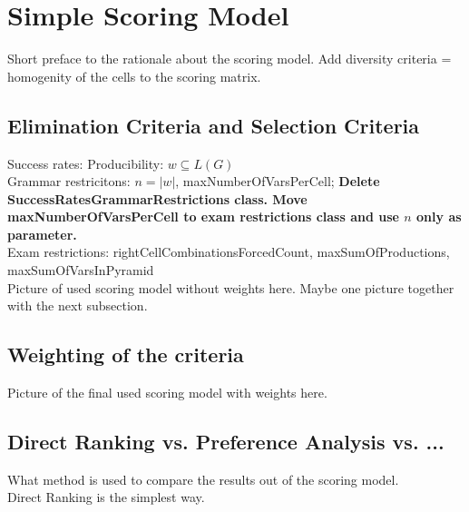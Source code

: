 
\section{Simple Scoring Model}

\noindent Short preface to the rationale about the scoring model. 
Add diversity criteria = homogenity of the cells to the scoring matrix.

\subsection{Elimination Criteria and Selection Criteria}

\noindent Success rates: 
Producibility: $w \subseteq L(G)$\\
Grammar restricitons: $n=|w|$, maxNumberOfVarsPerCell; \textbf{Delete SuccessRatesGrammarRestrictions class. Move maxNumberOfVarsPerCell to exam restrictions class and use $n$ only as parameter.} \\
Exam restrictions: rightCellCombinationsForcedCount, maxSumOfProductions, maxSumOfVarsInPyramid\\

\noindent Picture of used scoring model without weights here. Maybe one picture together with the next subsection. 

\subsection{Weighting of the criteria}

\noindent Picture of the final used scoring model with weights here. 

\subsection{Direct Ranking vs. Preference Analysis vs. ...}

What method is used to compare the results out of the scoring model.\\
Direct Ranking is the simplest way.

\pagebreak